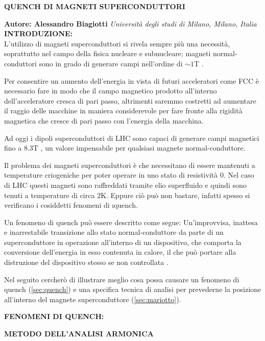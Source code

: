 \documentclass[a4paper,10pt]{article}
\begin{document}
\noindent
\begin{center}
	\textbf{{\Large QUENCH DI MAGNETI SUPERCONDUTTORI}} \\
\end{center}

\noindent
\textbf{Autore: Alessandro Biagiotti} \hfill \textit{Università degli studi di Milano, Milano, Italia}
\\

\noindent
{}
\label{sec:intro}
\textbf{INTRODUZIONE:}
\\
L'utilizzo di magneti superconduttori si rivela sempre più una necessità, soprattutto nel campo
della fisica nucleare e subnucleare; magneti normal-conduttori sono in grado di generare campi
nell'ordine di $\sim 1$T \cite{magnets}.

Per consentire un aumento dell'energia in vista di futuri acceleratori come FCC è necessario fare in
modo che il campo magnetico prodotto all'interno dell'acceleratore cresca di pari passo, altrimenti
saremmo costretti ad aumentare il raggio delle macchine in maniera considerevole per fare fronte
alla rigidità magnetica che cresce di pari passo con l'energia della macchina.

Ad oggi i dipoli superconduttori di LHC sono capaci di generare campi magnetici fino a $8.3$T
\cite{lhc-field}, un valore impensabile per qualsiasi magnete normal-conduttore.

Il problema dei magneti superconduttori è che necessitano di essere mantenuti a temperature
criogeniche per poter operare in uno stato di resistività $0$. Nel caso di LHC questi magneti sono
raffreddati tramite elio superfluido e quindi sono tenuti a temperature di circa $2$K. Eppure ciò
può non bastare, infatti spesso si verificano i cosiddetti fenomeni di \i{quench}.

Un fenomeno di quench può essere descritto come segue: Un'improvvisa, inattesa e inarrestabile
transizione allo stato normal-conduttore da parte di un superconduttore in operazione all'interno di
un dispositivo, che comporta la conversione dell'energia in esso contenuta in calore, il che può
portare alla distruzione del dispositivo stesso se non controllata \cite{quench-pres}.

Nel seguito cercherò di illustrare meglio cosa possa causare un fenomeno di quench
(\ref{sec:quench}) e una specifica tecnica di analisi per prevederne la posizione all'interno del
magnete superconduttore (\ref{sec:mariotto}).

\bigskip
{}
\label{sec:quench}
\noindent
\textbf{FENOMENI DI QUENCH:}

\bigskip
{}
\label{sec:mariotto}
\noindent
\textbf{METODO DELL'ANALISI ARMONICA}

\clearpage


\end{document}
